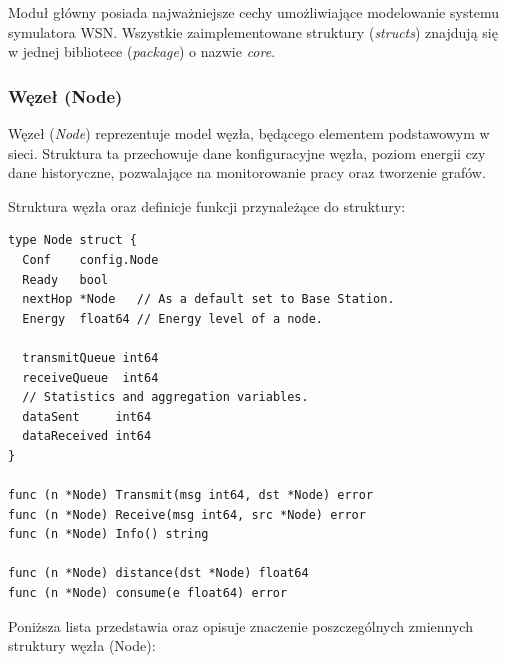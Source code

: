 \documentclass[a4paper,12pt,twoside,openany]{report}
\begin{document}
Moduł główny posiada najważniejsze cechy umożliwiające modelowanie systemu symulatora WSN.
Wszystkie zaimplementowane struktury (\textit{structs}) znajdują się w jednej bibliotece (\textit{package}) o nazwie \textit{core}.

\subsubsection{Węzeł (Node)}

Węzeł (\textit{Node}) reprezentuje model węzła, będącego elementem podstawowym w sieci. Struktura ta przechowuje dane konfiguracyjne węzła,
poziom energii czy dane historyczne, pozwalające na monitorowanie pracy oraz tworzenie grafów.

Struktura węzła oraz definicje funkcji przynależące do struktury:

\begin{lstlisting}
type Node struct {
  Conf    config.Node
  Ready   bool
  nextHop *Node   // As a default set to Base Station.
  Energy  float64 // Energy level of a node.

  transmitQueue int64
  receiveQueue  int64
  // Statistics and aggregation variables.
  dataSent     int64
  dataReceived int64
}

func (n *Node) Transmit(msg int64, dst *Node) error
func (n *Node) Receive(msg int64, src *Node) error
func (n *Node) Info() string

func (n *Node) distance(dst *Node) float64
func (n *Node) consume(e float64) error
\end{lstlisting}

Poniższa lista przedstawia oraz opisuje znaczenie poszczególnych zmiennych struktury węzła (Node):
\end{document}
